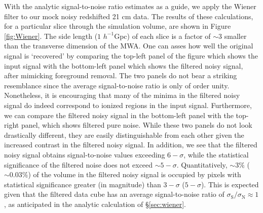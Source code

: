 With the analytic signal-to-noise ratio estimates as a guide, we apply
the Wiener filter to our mock noisy redshifted 21 cm data. The results
of these calculations, for a particular slice through the simulation
volume, are shown in Figure \ref{fig:Wiener}.  The side length ($1$ $h^{-1}$Gpc) of each slice
is a factor of $\sim 3$ smaller than the transverse dimension of the MWA. One can asses how well
the original signal is `recovered' by comparing the top-left panel of
the figure which shows the input signal with the bottom-left panel which
shows the filtered noisy signal, after mimicking foreground
removal. The two panels do not bear a striking resemblance since the
average signal-to-noise ratio is only of order
unity. Nonetheless, it is encouraging that many of the minima in 
the filtered noisy
signal do indeed correspond to ionized regions in the input signal.  Furthermore, we can compare the filtered noisy signal in the
bottom-left panel with the top-right panel, which shows filtered pure
noise. While these two panels do not look drastically different, they
are easily distinguishable from each other given the increased
contrast in the filtered noisy signal. 
In addition, we see that the
filtered noisy signal obtains signal-to-noise values exceeding
$6-\sigma$, while the statistical significance of the filtered noise
does not exceed $\sim 5-\sigma$. Quantitatively, $\sim 3\%$
($\sim 0.03\%$) of the volume in the filtered noisy signal is occupied
by pixels with statistical significance greater (in magnitude) than
$3-\sigma$ ($5-\sigma$). This is expected given that the filtered data cube
has an average signal-to-noise ratio of $\sigma_{\text{S}}/\sigma_{\text{N}} \approx 1$, as anticipated in the analytic calculation
of \S\ref{sec:wiener}.

